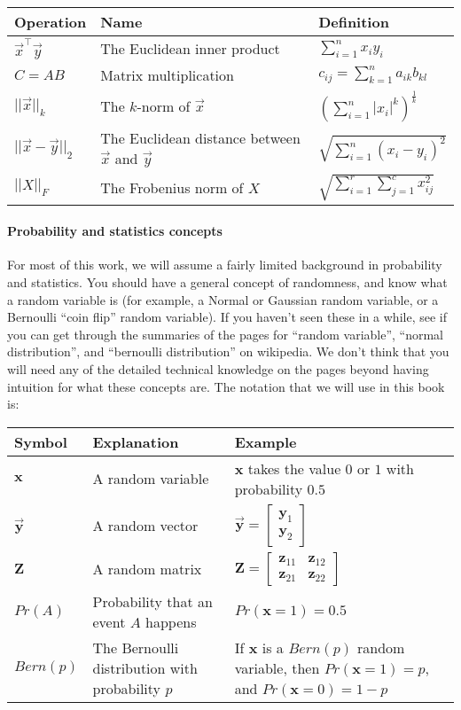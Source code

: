 \begin{tabular}{p{2cm} | p{4.5cm} | p{4cm}}
\hline
    Operation & Name & Definition \\
    \hline
     $\vec x^\top \vec y$ & The Euclidean inner product & $\sum_{i = 1}^n x_i y_i$ \\
     $C = AB$ & Matrix multiplication & $c_{ij} = \sum_{k = 1}^n a_{ik} b_{kl}$ \\
     $||\vec x||_k$ & The $k$-norm of $\vec x$ & $\left(\sum_{i = 1}^n |x_i|^k\right)^{\frac{1}{k}}$ \\
     $||\vec x - \vec y||_2$ & The Euclidean distance between $\vec x$ and $\vec y$ & $\sqrt{\sum_{i = 1}^n (x_i - y_i)^2}$ \\
     $||X||_F$ & The Frobenius norm of $X$ & $\sqrt{\sum_{i = 1}^r \sum_{j = 1}^c x_{ij}^2}$ \\
     \hline
\end{tabular}

\paragraph{Probability and statistics concepts}

For most of this work, we will assume a fairly limited background in probability and statistics. You should have a general concept of randomness, and know what a random variable is (for example, a Normal or Gaussian random variable, or a Bernoulli ``coin flip'' random variable). If you haven't seen these in a while, see if you can get through the summaries of the pages for ``random variable'', ``normal distribution'', and ``bernoulli distribution'' on wikipedia. We don't think that you will need any of the detailed technical knowledge on the pages beyond having intuition for what these concepts are. The notation that we will use in this book is:

\begin{tabular}{p{2cm} | p{4cm} | p{4cm}}
\hline
    Symbol & Explanation & Example \\
    \hline
    $\mathbf x$ & A random variable & $\mathbf x$ takes the value $0$ or $1$ with probability $0.5$\\
    $\vec{\mathbf y}$ & A random vector & $\vec{\mathbf y} = \begin{bmatrix}
         {\mathbf y}_1 \\ {\mathbf y}_2
     \end{bmatrix}$ \\
    $\mathbf Z$ & A random matrix & $\mathbf Z = \begin{bmatrix}\mathbf z_{11} & \mathbf z_{12} \\ \mathbf z_{21} & \mathbf z_{22}\end{bmatrix}$ \\
    $Pr(A)$ & Probability that an event $A$ happens & $Pr(\mathbf x = 1) = 0.5$ \\
    $Bern(p)$ & The Bernoulli distribution with probability $p$ & If $\mathbf x$ is a $Bern(p)$ random variable, then $Pr(\mathbf x = 1) = p$, and $Pr(\mathbf x = 0) = 1-p$ \\
    \hline
\end{tabular}





\endinput